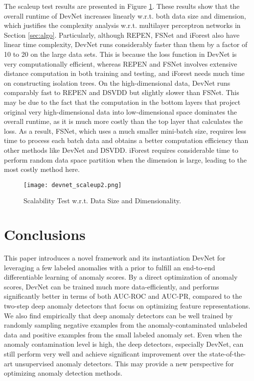 \documentclass[sigconf]{acmart}
\begin{document}
The scaleup test results are presented in Figure \ref{fig:scaleup}. These results show that the overall runtime of DevNet increases linearly w.r.t. both data size and dimension, which justifies the complexity analysis w.r.t. multilayer perceptron networks in Section \ref{sec:algo}. Particularly, although REPEN, FSNet and iForest also have linear time complexity, DevNet runs considerably faster than them by a factor of 10 to 20 on the large data sets. This is because the loss function in DevNet is very computationally efficient, whereas REPEN and FSNet involves extensive distance computation in both training and testing, and iForest needs much time on constructing isolation trees. On the high-dimensional data, DevNet runs comparably fast to REPEN and DSVDD but slightly slower than FSNet. This may be due to the fact that the computation in the bottom layers that project original very high-dimensional data into low-dimensional space dominates the overall runtime, as it is much more costly than the top layer that calculates the loss. As a result, FSNet, which uses a much smaller mini-batch size, requires less time to process each batch data and obtains a better computation efficiency than other methods like DevNet and DSVDD. iForest requires considerable time to perform random data space partition when the dimension is large, leading to the most costly method here.

\begin{figure}[h!]
  \centering
    \texttt{[image: devnet\_scaleup2.png]}
  \caption{Scalability Test w.r.t. Data Size and Dimensionality.}
  \label{fig:scaleup}
\end{figure}

\section{Conclusions}

This paper introduces a novel framework and its instantiation DevNet for leveraging a few labeled anomalies with a prior to fulfill an end-to-end differentiable learning of anomaly scores. By a direct optimization of anomaly scores, DevNet can be trained much more data-efficiently, and performs significantly better in terms of both AUC-ROC and AUC-PR, compared to the two-step deep anomaly detectors that focus on optimizing feature representations. We also find empirically that deep anomaly detectors can be well trained by randomly sampling negative examples from the anomaly-contaminated unlabeled data and positive examples from the small labeled anomaly set. Even when the anomaly contamination level is high, the deep detectors, especially DevNet, can still perform very well and achieve significant improvement over the state-of-the-art unsupervised anomaly detectors. This may provide a new perspective for optimizing anomaly detection methods.
\end{document}
